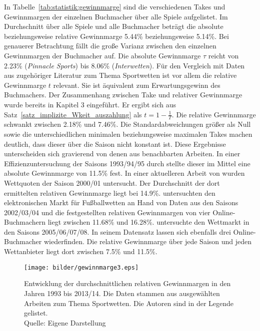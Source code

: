 In Tabelle~\ref{tab:statistik:gewinnmarge} sind die verschiedenen Takes und Gewinnmargen der einzelnen Buchmacher über alle Spiele aufgelistet. Im Durchschnitt über alle Spiele und alle Buchmacher beträgt die absolute beziehungsweise relative Gewinnmarge 5.44\% beziehungsweise 5.14\%. Bei genauerer Betrachtung fällt die große Varianz zwischen den einzelnen Gewinnmargen der Buchmacher auf. Die absolute Gewinnmarge $ \tau $ reicht von 2.23\% (\textit{Pinnacle Sports}) bis 8.06\% (\textit{Interwetten}). Für den Vergleich mit Daten aus zugehöriger Literatur zum Thema Sportwetten ist vor allem die relative Gewinnmarge $ t $ relevant. Sie ist äquivalent zum Erwartungsgewinn des Buchmachers. Der Zusammenhang zwischen Take und relativer Gewinnmarge wurde bereits in Kapitel 3 eingeführt. Er ergibt sich aus Satz~\ref{satz_implizite_Wkeit_auszahlung} als $ t = 1-\tfrac{1}{T} $. Die relative Gewinnmarge schwankt zwischen 2.18\% und 7.46\%. Die Standardabweichungen größer als Null sowie die unterschiedlichen minimalen beziehungsweise maximalen Takes machen deutlich, dass dieser über die Saison nicht konstant ist. Diese Ergebnisse unterscheiden sich gravierend von denen aus benachbarten Arbeiten. In einer Effizienzuntersuchung der Saisons 1993/94/95 durch \citet{kuypers2000information} stellte dieser im Mittel eine absolute Gewinnmarge von 11.5\% fest. In einer aktuelleren Arbeit von \citet{kossmeier2008efficiency} wurden Wettquoten der Saison 2000/01 untersucht. Der Durchschnitt der dort ermittelten relativen Gewinnmarge liegt bei 14.9\%. \citet{vlastakis2009efficient} untersuchten den elektronischen Markt für Fußballwetten an Hand von Daten aus den Saisons 2002/03/04 und die festgestellten relativen Gewinnmargen von vier Online-Buchmachern liegt zwischen 11.68\% und 16.28\%. \citet{barth2012oekonomie} untersuchte den Wettmarkt in den Saisons 2005/06/07/08. In seinem Datensatz lassen sich ebenfalls drei Online-Buchmacher wiederfinden. Die relative Gewinnmarge über jede Saison und jeden Wettanbieter liegt dort zwischen 7.5\% und 11.5\%.

\begin{figure}
 \centering
 	\texttt{[image: bilder/gewinnmarge3.eps]}
\caption[Entwicklung der Gewinnmarge in den Jahren 1993 bis 2013/14]{Entwicklung der durchschnittlichen relativen Gewinnmargen in den Jahren 1993 bis 2013/14. Die Daten stammen aus ausgewählten Arbeiten zum Thema Sportwetten. Die Autoren sind in der Legende gelistet. \\ Quelle: Eigene Darstellung}
\label{fig:entwicklung_gewinnmarge}
\end{figure}


